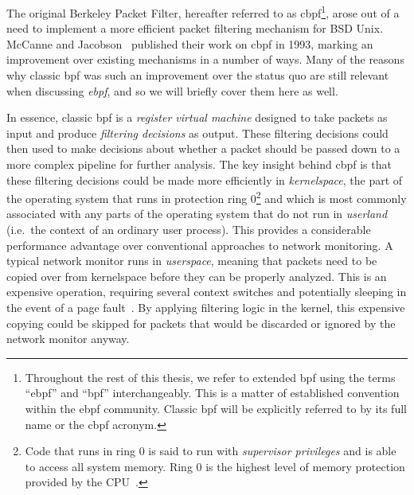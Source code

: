 The original Berkeley Packet Filter, hereafter referred to as \gls{cbpf}\footnote{%
Throughout the rest of this thesis, we refer to extended \gls{bpf} using the terms
\enquote{\gls{ebpf}} and \enquote{\gls{bpf}} interchangeably. This is a matter of established
convention within the \gls{ebpf} community. Classic \gls{bpf} will be explicitly referred to by its
full name or the \gls{cbpf} acronym.}, arose out of a need to implement a more efficient packet
filtering mechanism for BSD Unix.  McCanne and Jacobson~\cite{mccanne1993_bpf} published
their work on \gls{cbpf} in 1993, marking an improvement over existing mechanisms in a number of
ways. Many of the reasons why classic \gls{bpf} was such an improvement over the status quo are
still relevant when discussing \textit{\gls{ebpf}}, and so we will briefly cover them here as
well.

In essence, classic \gls{bpf} is a \textit{register virtual machine} designed to take packets as
input and produce \textit{filtering decisions} as output. These filtering decisions could
then used to make decisions about whether a packet should be passed down to a more complex
pipeline for further analysis. The key insight behind \gls{cbpf} is that these filtering
decisions could be made more efficiently in \textit{kernelspace}, the part of the
operating system that runs in protection ring 0\footnote{Code that runs in ring 0 is said
to run with \textit{supervisor privileges} and is able to access all system memory. Ring
0 is the highest level of memory protection provided by the CPU~\cite{jaeger2008_os_security}.}
and which is most commonly associated with any parts of the operating system that do not
run in \textit{userland} (i.e.~the context of an ordinary user process). This provides
a considerable performance advantage over conventional approaches to network monitoring.
A typical network monitor runs in \textit{userspace}, meaning that packets need to be
copied over from kernelspace before they can be properly analyzed. This is an expensive
operation, requiring several context switches and potentially sleeping in the event of
a page fault~\cite{mccanne1993_bpf}.  By applying filtering logic in the kernel, this
expensive copying could be skipped for packets that would be discarded or ignored by the
network monitor anyway.

